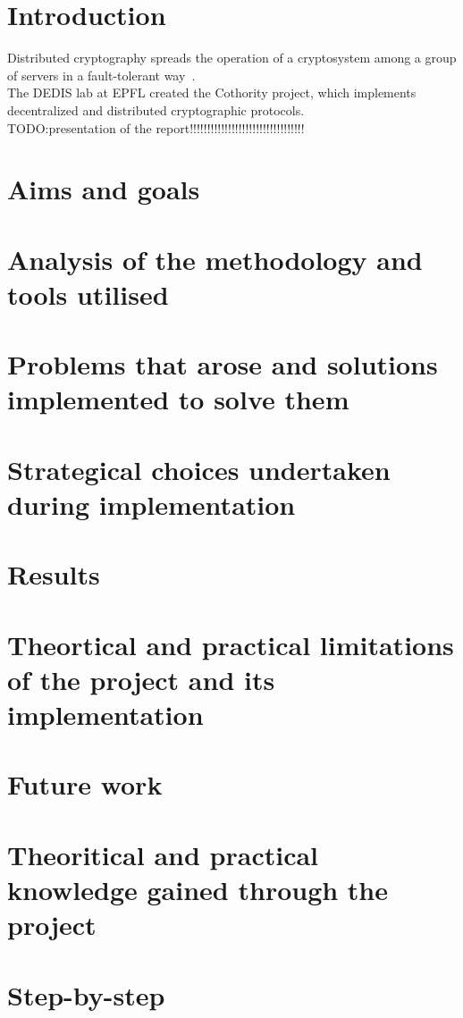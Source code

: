 \documentclass[11pt, a4paper, twoside, openright]{book} %
\begin{document}


\begingroup
\let\cleardoublepage\clearpage
\tableofcontents
\endgroup

\chapter{Introduction}
Distributed cryptography spreads the operation of a cryptosystem among a group
of servers in a fault-tolerant way~\cite{definition}.\\
The DEDIS lab at EPFL created the Cothority project, which implements decentralized
and distributed cryptographic protocols.\\

TODO:presentation of the report!!!!!!!!!!!!!!!!!!!!!!!!!!!!!!!!!

\chapter{Aims and goals}
\chapter{Analysis of the methodology and tools utilised}
\chapter{Problems that arose and solutions implemented to solve them}
\chapter{Strategical choices undertaken during implementation}
\chapter{Results}
\chapter{Theortical and practical limitations of the project and its implementation}
\chapter{Future work}
\chapter{Theoritical and practical knowledge gained through the project}
\chapter{Step-by-step}
\end{document}
